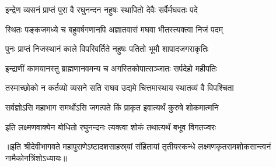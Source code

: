 \twolineshloka
{इन्द्रेण व्यसनं प्राप्तं पुरा वै रघुनन्दन}
{नहुषः स्थापितो देवैः सर्वैर्मघवतः पदे}%

\twolineshloka
{स्थितः पङ्कजमध्ये च बहुवर्षगणानपि}
{अज्ञातवासं मघवा भीतस्त्यक्त्वा निजं पदम्}%

\twolineshloka
{पुनः प्राप्तं निजस्थानं काले विपरिवर्तिते}
{नहुषः पतितो भूमौ शापादजगराकृतिः}%

\twolineshloka
{इन्द्राणीं कामयानस्तु ब्राह्मणानवमन्य च}
{अगस्तिकोपात्सञ्जातः सर्पदेहो महीपतिः}%

\twolineshloka
{तस्माच्छोको न कर्तव्यो व्यसने सति राघव}
{उद्यमे चित्तमास्थाय स्थातव्यं वै विपश्चिता}%

\twolineshloka
{सर्वज्ञोऽसि महाभाग समर्थोऽसि जगत्पते}
{किं प्राकृत इवात्यर्थं कुरुषे शोकमात्मनि}%



\twolineshloka
{इति लक्ष्मणवाक्येन बोधितो रघुनन्दनः}
{त्यक्त्वा शोकं तथात्यर्थं बभूव विगतज्वरः}%


॥इति श्रीदेवीभागवते महापुराणेऽष्टादशसाहस्र्यां संहितायां तृतीयस्कन्धे लक्ष्मणकृतरामशोकसान्त्वनं नामैकोनत्रिंशोऽध्यायः॥
